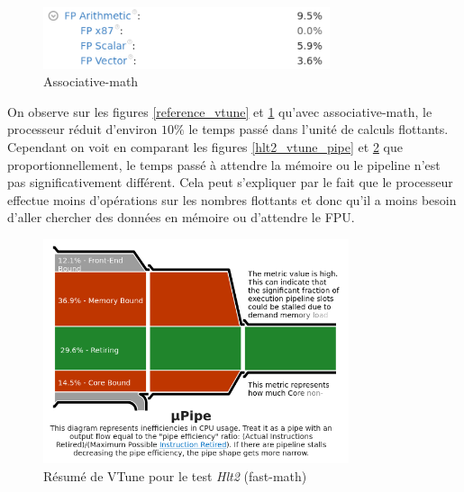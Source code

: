 \documentclass[a4paper,11pt]{report}
\begin{document}
\begin{figure}[H]
    \includegraphics[width=0.75\textwidth, center]{associative-math_vtune.png}
    \caption{Associative-math}
    \label{associative-math_vtune}
\end{figure}

On observe sur les figures \ref{reference_vtune} et \ref{associative-math_vtune} qu'avec associative-math, le processeur réduit d'environ $10\%$ le temps passé dans l'unité de calculs flottants.
Cependant on voit en comparant les figures \ref{hlt2_vtune_pipe} et \ref{fast-math_vtune_pipe} que proportionnellement, le temps passé à attendre la mémoire ou le pipeline n'est pas significativement différent.
Cela peut s'expliquer par le fait que le processeur effectue moins d'opérations sur les nombres flottants et donc qu'il a moins besoin d'aller chercher des données en mémoire ou d'attendre le FPU.

\begin{figure}[H]
    \includegraphics[width=0.8\textwidth, center]{fast-math_vtune_pipe.png}
    \caption{Résumé de VTune pour le test \emph{Hlt2} (fast-math)}
    \label{fast-math_vtune_pipe}
\end{figure}
\end{document}

